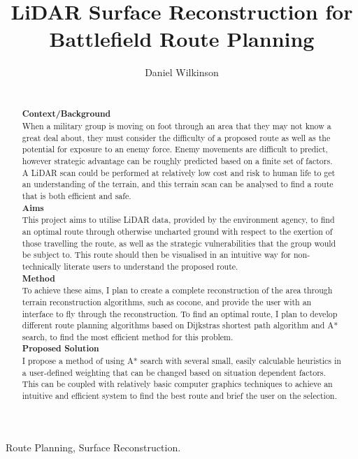 \documentclass[12pt,a4paper]{article}
\title{LiDAR Surface Reconstruction for Battlefield Route Planning}
\author{Daniel Wilkinson}
\date{}
\begin{document}
\maketitle

\begin{abstract}\\
  \textbf{Context/Background}\\
  When a military group is moving on foot through an area that they may not know a great deal about, they must consider the difficulty of a proposed route as well as the potential for exposure to an enemy force. Enemy movements are difficult to predict, however strategic advantage can be roughly predicted based on a finite set of factors. A LiDAR scan could be performed at relatively low cost and risk to human life to get an understanding of the terrain, and this terrain scan can be analysed to find a route that is both efficient and safe. \\
  \textbf{Aims}\\
  This project aims to utilise LiDAR data, provided by the environment agency, to find an optimal route through otherwise uncharted ground with respect to the exertion of those travelling the route, as well as the strategic vulnerabilities that the group would be subject to. This route should then be visualised in an intuitive way for non-technically literate users to understand the proposed route.\\
  \textbf{Method}\\
  To achieve these aims, I plan to create a complete reconstruction of the area through terrain reconstruction algorithms, such as cocone, and provide the user with an interface to fly through the reconstruction. To find an optimal route, I plan to develop different route planning algorithms based on Dijkstra\textquotesingle s shortest path algorithm and A* search, to find the most efficient method for this problem.\\
  \textbf{Proposed Solution}\\
  I propose a method of using A* search with several small, easily calculable heuristics in a user-defined weighting that can be changed based on situation dependent factors. This can be coupled with relatively basic computer graphics techniques to achieve an intuitive and efficient system to find the best route and brief the user on the selection.\\
\end{abstract}

\begin{keywords}
Route Planning, Surface Reconstruction.
\end{keywords}
\end{document}

